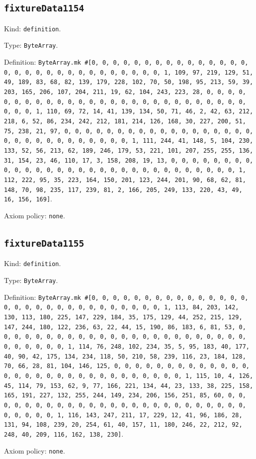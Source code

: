 \documentclass[11pt]{article}
\begin{document}
\subsection*{\texttt{fixtureData1154}}
\noindent Kind: \texttt{definition}.\par
\noindent Type: \texttt{ByteArray}.\par
\noindent Definition: \texttt{ByteArray.mk \#[0, 0, 0, 0, 0, 0, 0, 0, 0, 0, 0, 0, 0, 0, 0, 0, 0, 0, 0, 0, 0, 0, 0, 0, 0, 0, 0, 0, 0, 0, 1, 109, 97, 219, 129, 51, 49, 189, 83, 68, 82, 139, 179, 228, 102, 70, 50, 198, 95, 213, 59, 39, 203, 165, 206, 107, 204, 211, 19, 62, 104, 243, 223, 28, 0, 0, 0, 0, 0, 0, 0, 0, 0, 0, 0, 0, 0, 0, 0, 0, 0, 0, 0, 0, 0, 0, 0, 0, 0, 0, 0, 0, 0, 0, 1, 110, 69, 72, 14, 41, 139, 134, 50, 71, 46, 2, 42, 63, 212, 218, 6, 52, 86, 234, 242, 212, 181, 214, 126, 168, 30, 227, 200, 51, 75, 238, 21, 97, 0, 0, 0, 0, 0, 0, 0, 0, 0, 0, 0, 0, 0, 0, 0, 0, 0, 0, 0, 0, 0, 0, 0, 0, 0, 0, 0, 0, 0, 0, 1, 111, 244, 41, 148, 5, 104, 230, 133, 52, 56, 213, 62, 189, 246, 179, 53, 221, 101, 207, 255, 255, 136, 31, 154, 23, 46, 110, 17, 3, 158, 208, 19, 13, 0, 0, 0, 0, 0, 0, 0, 0, 0, 0, 0, 0, 0, 0, 0, 0, 0, 0, 0, 0, 0, 0, 0, 0, 0, 0, 0, 0, 0, 0, 1, 112, 222, 95, 35, 223, 164, 150, 201, 123, 244, 201, 90, 68, 62, 81, 148, 70, 98, 235, 117, 239, 81, 2, 166, 205, 249, 133, 220, 43, 49, 16, 156, 169]}.\par
\noindent Axiom policy: \texttt{none}.\par
\subsection*{\texttt{fixtureData1155}}
\noindent Kind: \texttt{definition}.\par
\noindent Type: \texttt{ByteArray}.\par
\noindent Definition: \texttt{ByteArray.mk \#[0, 0, 0, 0, 0, 0, 0, 0, 0, 0, 0, 0, 0, 0, 0, 0, 0, 0, 0, 0, 0, 0, 0, 0, 0, 0, 0, 0, 0, 0, 1, 113, 84, 203, 142, 130, 113, 180, 225, 147, 229, 184, 35, 175, 129, 44, 252, 215, 129, 147, 244, 180, 122, 236, 63, 22, 44, 15, 190, 86, 183, 6, 81, 53, 0, 0, 0, 0, 0, 0, 0, 0, 0, 0, 0, 0, 0, 0, 0, 0, 0, 0, 0, 0, 0, 0, 0, 0, 0, 0, 0, 0, 0, 0, 1, 114, 76, 248, 102, 234, 35, 5, 95, 183, 40, 177, 40, 90, 42, 175, 134, 234, 118, 50, 210, 58, 239, 116, 23, 184, 128, 70, 66, 28, 81, 104, 146, 125, 0, 0, 0, 0, 0, 0, 0, 0, 0, 0, 0, 0, 0, 0, 0, 0, 0, 0, 0, 0, 0, 0, 0, 0, 0, 0, 0, 0, 0, 0, 1, 115, 10, 4, 126, 45, 114, 79, 153, 62, 9, 77, 166, 221, 134, 44, 23, 133, 38, 225, 158, 165, 191, 227, 132, 255, 244, 149, 234, 206, 156, 251, 85, 60, 0, 0, 0, 0, 0, 0, 0, 0, 0, 0, 0, 0, 0, 0, 0, 0, 0, 0, 0, 0, 0, 0, 0, 0, 0, 0, 0, 0, 0, 0, 1, 116, 143, 247, 211, 17, 229, 12, 41, 96, 186, 28, 131, 94, 108, 239, 20, 254, 61, 40, 157, 11, 180, 246, 22, 212, 92, 248, 40, 209, 116, 162, 138, 230]}.\par
\noindent Axiom policy: \texttt{none}.\par
\end{document}
